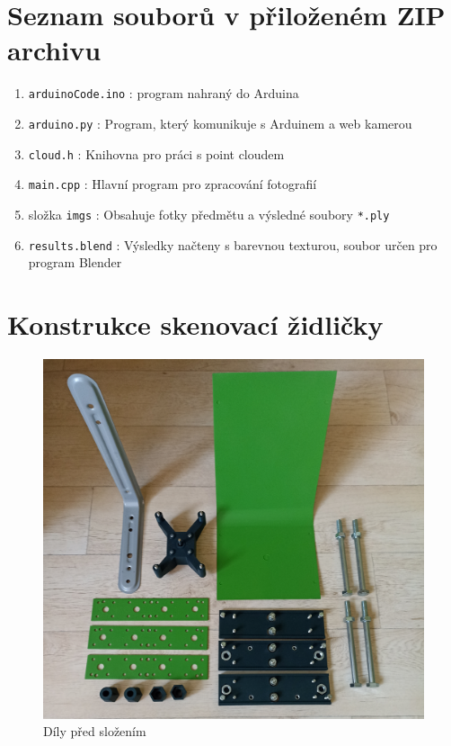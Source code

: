 \documentclass[12pt]{report}			%
\begin{document}
    \begin{appendices}
        \chapter*{Seznam souborů v přiloženém ZIP archivu}
            \begin{enumerate}
                \item \verb|arduinoCode.ino| : program nahraný do Arduina
                \item \verb|arduino.py| : Program, který komunikuje s Arduinem a web kamerou
                \item \verb|cloud.h| : Knihovna pro práci s point cloudem
                \item \verb|main.cpp| : Hlavní program pro zpracování fotografií
                \item složka \verb|imgs| : Obsahuje fotky předmětu a výsledné soubory \verb|*.ply|
                \item \verb|results.blend| : Výsledky načteny s barevnou texturou, soubor určen pro program Blender
            \end{enumerate}
    	\chapter{Konstrukce skenovací židličky}

    	\begin{figure}[h]
    	    \centering
    	    \includegraphics[width=\textwidth]{images/dily.jpg}
    	    \caption{Díly před složením}
    	\end{figure}
        

\end{appendices}
\end{document}
